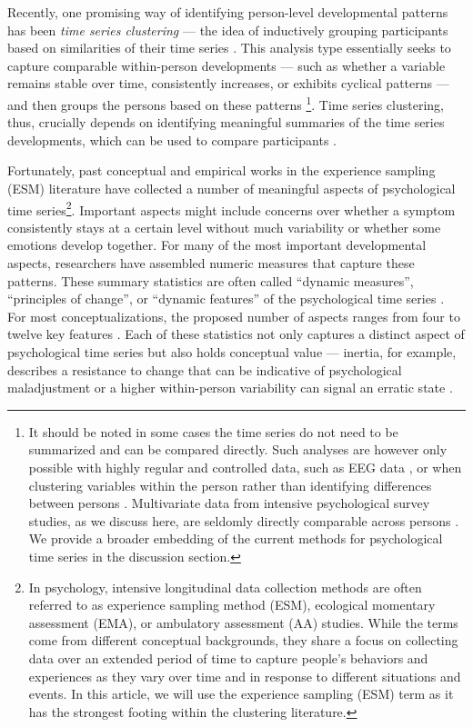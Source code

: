 \documentclass[man, 12pt, a4paper, mask, floatsintext]{apa7}
\theoremstyle{break}
\theoremstyle{plain}
\begin{document}
Recently, one promising way of identifying person-level developmental patterns has been \textit{time series clustering} --- the idea of inductively grouping participants based on similarities of their time series \citep{ariens2020}. This analysis type essentially seeks to capture comparable within-person developments --- such as whether a variable remains stable over time, consistently increases, or exhibits cyclical patterns --- and then groups the persons based on these patterns  \citep[][]{liao2005}\footnote{It should be noted in some cases the time series do not need to be summarized and can be compared directly. Such analyses are however only possible with highly regular and controlled data, such as EEG data \citep{huang1985}, or when clustering variables within the person rather than identifying differences between persons \citep{haslbeck2022}. Multivariate data from intensive psychological survey studies, as we discuss here, are seldomly directly comparable across persons \citep[e.g., ][]{faloutsos1994}. We provide a broader embedding of the current methods for psychological time series in the discussion section.}. Time series clustering, thus, crucially depends on identifying meaningful summaries of the time series developments, which can be used to compare participants \citep[][]{Aghabozorgi2015}. 

Fortunately, past conceptual and empirical works in the experience sampling (ESM) literature have collected a number of meaningful aspects of psychological time series\footnote{In psychology, intensive longitudinal data collection methods are often referred to as experience sampling method (ESM), ecological momentary assessment (EMA), or ambulatory assessment (AA) studies. While the terms come from different conceptual backgrounds, they share a focus on collecting data over an extended period of time to capture people's behaviors and experiences as they vary over time and in response to different situations and events. In this article, we will use the experience sampling (ESM) term as it has the strongest footing within the clustering literature.}. Important aspects might include concerns over whether a symptom consistently stays at a certain level without much variability or whether some emotions develop together. For many of the most important developmental aspects, researchers have assembled numeric measures that capture these patterns. These summary statistics are often called ``dynamic measures'', ``principles of change'', or ``dynamic features'' of the psychological time series \citep{dejonckheere2019, kuppens2017, krone2018}. For most conceptualizations, the proposed number of aspects ranges from four to twelve key features \citep[][]{wang2006, dejonckheere2019}. Each of these statistics not only captures a distinct aspect of psychological time series but also holds conceptual value --- inertia, for example, describes a resistance to change that can be indicative of psychological maladjustment \citep{kuppens2010} or a higher within-person variability can signal an erratic state \citep{myin-germeys2018}.
\end{document}
